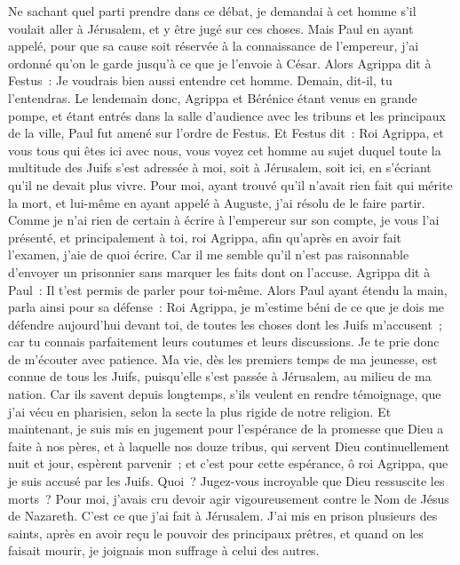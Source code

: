 \begin{multicols}{2}
Ne sachant quel parti prendre dans ce débat, je demandai à cet homme s'il voulait aller à Jérusalem, et y être jugé sur ces choses.
Mais Paul en ayant appelé, pour que sa cause soit réservée à la connaissance de l'empereur, j'ai ordonné qu'on le garde jusqu'à ce que je l'envoie à César.
Alors Agrippa dit à Festus~: Je voudrais bien aussi entendre cet homme. Demain, dit-il, tu l'entendras.
Le lendemain donc, Agrippa et Bérénice étant venus en grande pompe, et étant entrés dans la salle d'audience avec les tribuns et les principaux de la ville, Paul fut amené sur l'ordre de Festus.
Et Festus dit~: Roi Agrippa, et vous tous qui êtes ici avec nous, vous voyez cet homme au sujet duquel toute la multitude des Juifs s'est adressée à moi, soit à Jérusalem, soit ici, en s'écriant qu'il ne devait plus vivre.
Pour moi, ayant trouvé qu'il n'avait rien fait qui mérite la mort, et lui-même en ayant appelé à Auguste, j'ai résolu de le faire partir.
Comme je n'ai rien de certain à écrire à l'empereur sur son compte, je vous l'ai présenté, et principalement à toi, roi Agrippa, afin qu'après en avoir fait l'examen, j'aie de quoi écrire.
Car il me semble qu'il n'est pas raisonnable d'envoyer un prisonnier sans marquer les faits dont on l'accuse.
\VerseOne{}Agrippa dit à Paul~: Il t'est permis de parler pour toi-même. Alors Paul ayant étendu la main, parla ainsi pour sa défense~:
Roi Agrippa, je m'estime béni de ce que je dois me défendre aujourd'hui devant toi, de toutes les choses dont les Juifs m'accusent~;
car tu connais parfaitement leurs coutumes et leurs discussions. Je te prie donc de m'écouter avec patience.
Ma vie, dès les premiers temps de ma jeunesse, est connue de tous les Juifs, puisqu'elle s'est passée à Jérusalem, au milieu de ma nation.
Car ils savent depuis longtemps, s'ils veulent en rendre témoignage, que j'ai vécu en pharisien, selon la secte la plus rigide de notre religion.
Et maintenant, je suis mis en jugement pour l'espérance de la promesse que Dieu a faite à nos pères,
et à laquelle nos douze tribus, qui servent Dieu continuellement nuit et jour, espèrent parvenir~; et c'est pour cette espérance, ô roi Agrippa, que je suis accusé par les Juifs.
Quoi~? Jugez-vous incroyable que Dieu ressuscite les morts~?
Pour moi, j'avais cru devoir agir vigoureusement contre le Nom de Jésus de Nazareth.
C'est ce que j'ai fait à Jérusalem. J'ai mis en prison plusieurs des saints, après en avoir reçu le pouvoir des principaux prêtres, et quand on les faisait mourir, je joignais mon suffrage à celui des autres.

\end{multicols}
